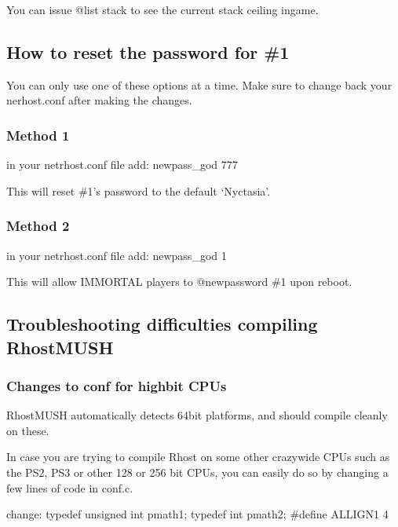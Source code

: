 \documentclass[letterpaper,10pt,english]{sphinxmanual}
\begin{document}
\sphinxAtStartPar
You can issue @list stack to see the current stack ceiling ingame.


\subsection{How to reset the password for \#1}
\label{\detokenize{troubleshooting:how-to-reset-the-password-for-1}}
\sphinxAtStartPar
You can only use one of these options at a time. Make sure to change back your nerhost.conf after making the changes.


\subsubsection{Method 1}
\label{\detokenize{troubleshooting:method-1}}
\sphinxAtStartPar
in your netrhost.conf file add:
newpass\_god 777

\sphinxAtStartPar
This will reset \#1’s password to the default ‘Nyctasia’.


\subsubsection{Method 2}
\label{\detokenize{troubleshooting:method-2}}
\sphinxAtStartPar
in your netrhost.conf file add:
newpass\_god 1

\sphinxAtStartPar
This will allow IMMORTAL players to @newpassword \#1 upon reboot.


\subsection{Troubleshooting difficulties compiling RhostMUSH}
\label{\detokenize{troubleshooting:troubleshooting-difficulties-compiling-rhostmush}}

\subsubsection{Changes to conf for high\sphinxhyphen{}bit CPUs}
\label{\detokenize{troubleshooting:changes-to-conf-for-high-bit-cpus}}
\sphinxAtStartPar
RhostMUSH automatically detects 64\sphinxhyphen{}bit platforms, and should compile
cleanly on these.

\sphinxAtStartPar
In case you are trying to compile Rhost on some other crazy\sphinxhyphen{}wide CPUs
such as the PS2, PS3 or other 128 or 256 bit CPUs, you can easily do
so by changing a few lines of code in conf.c.

\sphinxAtStartPar
change:
typedef unsigned int    pmath1;
typedef int             pmath2;
\#define ALLIGN1 4
\end{document}

